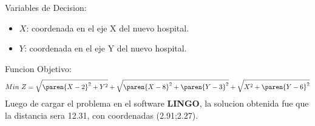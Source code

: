 \begin{homeworkProblem}
Variables de Decision:
\begin{itemize}
    \item $X$: coordenada en el eje X del nuevo hospital.
    \item $Y$: coordenada en el eje Y del nuevo hospital.
\end{itemize}
Funcion Objetivo:
\begin{align*}
    Min\ Z = \sqrt{\paren{X-2}^2+Y^2} + \sqrt{\paren{X-8}^2+\paren{Y-3}^2} + \sqrt{X^2+\paren{Y-6}^2}
\end{align*}
Luego de cargar el problema en el software \textbf{LINGO}, la solucion obtenida fue que la distancia sera 12.31, con coordenadas (2.91;2.27).
 
\end{homeworkProblem}